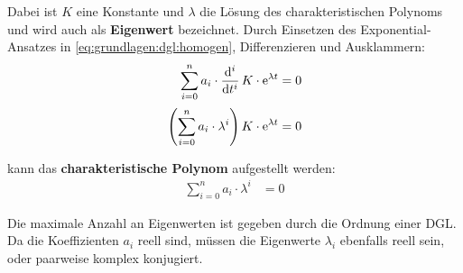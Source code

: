 \begin{frame}
{    %

    Dabei ist $K$ eine Konstante und $\lambda$ die Lösung des charakteristischen Polynoms 
    und wird auch als \textbf{Eigenwert} bezeichnet. 
    Durch Einsetzen des Exponential-Ansatzes in \ref{eq:grundlagen:dgl:homogen}, Differenzieren und Ausklammern:
    \begin{align}
        \sum_{i=0}^{n} a_i \cdot \dt[i]\, K \cdot \mathrm{e}^{\lambda t} &= 0 \nonumber\\[2pt]
        \left(\sum_{i=0}^{n} a_i \cdot \lambda^i \right) K \cdot \mathrm{e}^{\lambda t} &= 0 \nonumber\\[4pt]
    \end{align}
    kann das \textbf{charakteristische Polynom} aufgestellt werden:
    \begin{align}
        \sum_{i=0}^{n} a_i \cdot \lambda^i &= 0
    \end{align}

    Die maximale Anzahl an Eigenwerten ist gegeben durch die Ordnung einer DGL. 
    Da die Koeffizienten $a_i$ reell sind, müssen die Eigenwerte $\lambda_i$ ebenfalls reell sein, oder paarweise komplex konjugiert.

}
\end{frame}
